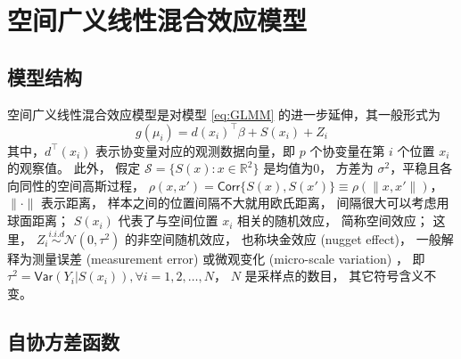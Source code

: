 \documentclass[12pt,a4paper,UTF8,twoside]{book}
\theoremstyle{definition}
\theoremstyle{definition}
\theoremstyle{definition}
\theoremstyle{remark}
\begin{document}
\hypertarget{sec:Spatial-Generalized-linear-mixed-effects-models}{%
\section{空间广义线性混合效应模型}\label{sec:Spatial-Generalized-linear-mixed-effects-models}}

\hypertarget{subsec:structure-sglmm}{%
\subsection{模型结构}\label{subsec:structure-sglmm}}

空间广义线性混合效应模型是对模型 \eqref{eq:GLMM}
的进一步延伸，其一般形式为 \begin{equation}
g(\mu_i) = d(x_i)^{\top}\beta + S(x_i) + Z_i \label{eq:SGLMM}
\end{equation} \noindent 其中，\(d^{\top}(x_i)\)
表示协变量对应的观测数据向量，即 \(p\) 个协变量在第 \(i\) 个位置 \(x_i\)
的观察值。 此外， 假定 \(\mathcal{S} = \{S(x): x \in \mathbb{R}^2\}\)
是均值为0， 方差为 \(\sigma^2\)，平稳且各向同性的空间高斯过程，
\(\rho(x,x') = \mathsf{Corr}\{S(x),S(x')\} \equiv \rho(\|x,x'\|)\)，
\(\|\cdot\|\) 表示距离， 样本之间的位置间隔不大就用欧氏距离，
间隔很大可以考虑用球面距离； \(S(x_i)\) 代表了与空间位置 \(x_i\)
相关的随机效应， 简称空间效应； 这里，
\(Z_i \stackrel{i.i.d}{\sim} \mathcal{N}(0,\tau^2)\) 的非空间随机效应，
也称块金效应 (nugget effect)， 一般解释为测量误差 (measurement error)
或微观变化 (micro-scale variation) \citep{Christensen2004}， 即
\(\tau^2=\mathsf{Var}(Y_{i}|S(x_{i})),\forall i = 1,2, \ldots, N\)，
\(N\) 是采样点的数目， 其它符号含义不变。

\hypertarget{subsec:covariance-function}{%
\subsection{自协方差函数}\label{subsec:covariance-function}}
\end{document}
